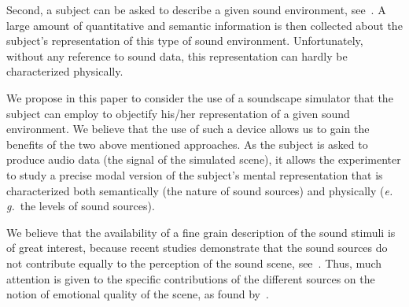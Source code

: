 \documentclass[12pt]{elsarticle}
\newcommand{\ie}{\emph{i.\,e.}}
\newcommand{\eg}{\emph{e.\,g.}}
\begin{document}
Second, a subject can be asked to describe a given sound environment, see~\cite{guastavino2006ideal, dubois2006cognitive}. A large amount of quantitative and semantic information is then collected about the subject's representation of this type of sound environment. Unfortunately, without any reference to sound data, this representation can hardly be characterized physically.


We propose in this paper to consider the use of a soundscape simulator that the subject can employ to objectify his/her representation of a given sound environment. We believe that the use of such a device allows us to gain the benefits of the two above mentioned approaches. As the subject is asked to produce audio data (the signal of the simulated scene), it allows the experimenter to study a precise modal version of the subject's mental representation that is characterized both semantically (the nature of sound sources) and physically (\eg~the levels of sound sources).


We believe that the availability of a fine grain description of the sound stimuli is of great interest, because recent studies demonstrate that the sound sources do not contribute equally to the perception of the sound scene, see~\cite{defreville2004aactivity,lavandier2006contribution,guastavino2006ideal,nilsson2007soundscape,szeremeta2009analysis}. Thus, much attention is given to the specific contributions of the different sources on the notion of emotional quality of the scene, as found by~\cite{gozalo2015relationship,ricciardi2015sound}.
\end{document}
